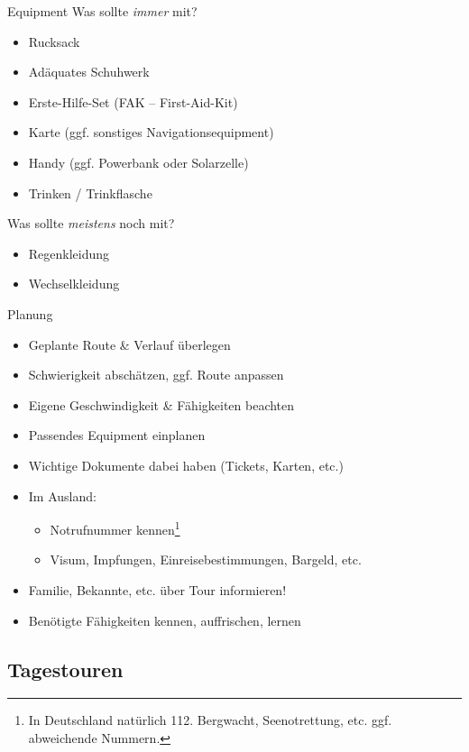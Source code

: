 \documentclass[aspectratio=169]{beamer}
\begin{document}
		\begin{frame}{Equipment}
			Was sollte \textit{immer} mit?
			\begin{itemize}
				\item Rucksack
				\item Adäquates Schuhwerk
				\item Erste-Hilfe-Set (FAK -- First-Aid-Kit)
				\item Karte (ggf. sonstiges Navigationsequipment)
				\item Handy (ggf. Powerbank oder Solarzelle)
				\item Trinken / Trinkflasche
			\end{itemize}\pause
			Was sollte \textit{meistens} noch mit?
			\begin{itemize}
				\item Regenkleidung
				\item Wechselkleidung
			\end{itemize}
		\end{frame}
		
		\begin{frame}{Planung}
			\begin{itemize}
				\item Geplante Route \& Verlauf überlegen
				\item Schwierigkeit abschätzen, ggf. Route anpassen
				\item Eigene Geschwindigkeit \& Fähigkeiten beachten
				\item Passendes Equipment einplanen
				\item Wichtige Dokumente dabei haben (Tickets, Karten, etc.)
				\item Im Ausland:
				\begin{itemize}
					\item Notrufnummer kennen\footnote{In Deutschland natürlich 112. Bergwacht, Seenotrettung, etc. ggf. abweichende Nummern.}
					\item Visum, Impfungen, Einreisebestimmungen, Bargeld, etc.
				\end{itemize}
				\item Familie, Bekannte, etc. über Tour informieren!
				\item Benötigte Fähigkeiten kennen, auffrischen, lernen
			\end{itemize}
		\end{frame}
	
		\subsection{Tagestouren}
		
\end{document}
